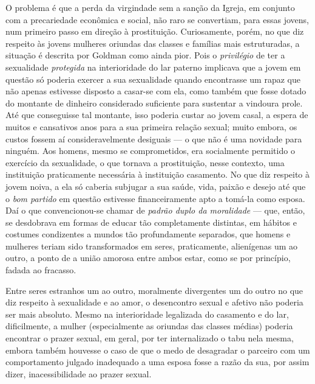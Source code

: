 O problema é que a perda da virgindade sem a sanção da
Igreja, em conjunto com a precariedade econômica e social, não raro se
convertiam, para essas jovens, num primeiro passo em direção à
prostituição. Curiosamente, porém, no que diz respeito às jovens
mulheres oriundas das classes e famílias mais estruturadas, a situação é
descrita por Goldman como ainda pior. Pois o \textit{privilégio} de ter a
sexualidade \textit{protegida} na interioridade do lar paterno implicava que
a jovem em questão só poderia exercer a sua sexualidade quando
encontrasse um rapaz que não apenas estivesse disposto a casar-se com
ela, como também que fosse dotado do montante de dinheiro considerado
suficiente para sustentar a vindoura prole. Até que conseguisse tal
montante, isso poderia custar ao jovem casal, a espera de muitos e
cansativos anos para a sua primeira relação sexual; muito embora, os
custos fossem aí consideravelmente desiguais --- o que não é uma novidade
para ninguém. Aos homens, mesmo se comprometidos, era socialmente
permitido o exercício da sexualidade, o que tornava a prostituição,
nesse contexto, uma instituição praticamente necessária à instituição
casamento. No que diz respeito à jovem noiva, a ela só caberia subjugar
a sua saúde, vida, paixão e desejo até que o \textit{bom partido} em questão
estivesse financeiramente apto a tomá-la como esposa. Daí o que
convencionou-se chamar de \textit{padrão duplo da moralidade} --- que, então,
se desdobrava em formas de educar tão completamente distintas, em
hábitos e costumes condizentes a mundos tão profundamente separados, que
homens e mulheres teriam sido transformados em seres, praticamente,
alienígenas um ao outro, a ponto de a união amorosa entre ambos estar,
como se por princípio, fadada ao fracasso.

Entre seres estranhos um ao outro, moralmente divergentes um do
outro no que diz respeito à sexualidade e ao amor, o desencontro sexual
e afetivo não poderia ser mais absoluto. Mesmo na interioridade
legalizada do casamento e do lar, dificilmente, a mulher (especialmente
as oriundas das classes médias) poderia encontrar o prazer sexual, em
geral, por ter internalizado o tabu nela mesma, embora também houvesse o
caso de que o medo de desagradar o parceiro com um comportamento julgado
inadequado a uma esposa fosse a razão da sua, por assim dizer,
inacessibilidade ao prazer sexual. 

